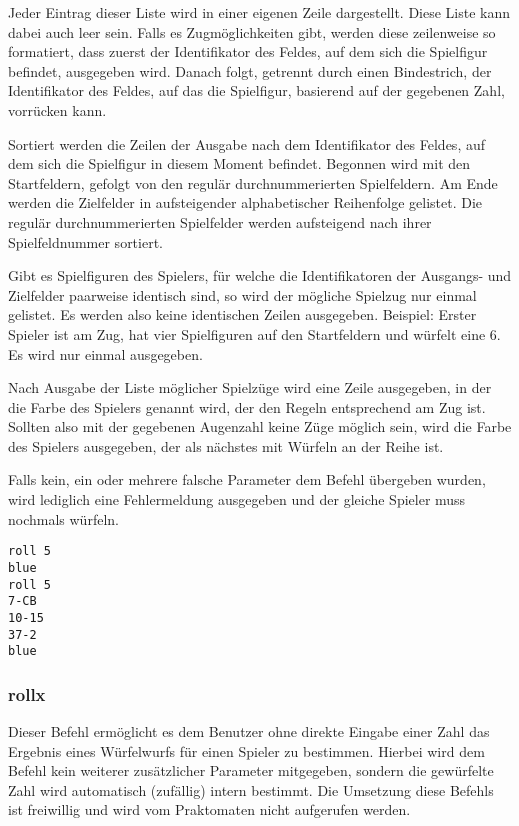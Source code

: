 Jeder Eintrag dieser Liste wird in einer eigenen Zeile dargestellt. Diese Liste kann dabei auch leer sein. Falls es Zugmöglichkeiten gibt, werden diese zeilenweise so formatiert, dass zuerst der Identifikator des Feldes, auf dem sich die Spielfigur befindet, ausgegeben wird. Danach folgt, getrennt durch einen Bindestrich, der Identifikator des Feldes, auf das die Spielfigur, basierend auf der gegebenen Zahl, vorrücken kann.

Sortiert werden die Zeilen der Ausgabe nach dem Identifikator des Feldes, auf dem sich die Spielfigur in diesem Moment befindet. Begonnen wird mit den Startfeldern, gefolgt von den regulär durchnummerierten Spielfeldern. Am Ende werden die Zielfelder in aufsteigender alphabetischer Reihenfolge gelistet. Die regulär durchnummerierten Spielfelder werden aufsteigend nach ihrer Spielfeldnummer sortiert.

Gibt es Spielfiguren des Spielers, für welche die Identifikatoren der Ausgangs- und Zielfelder paarweise identisch sind, so wird der mögliche Spielzug nur einmal gelistet. Es werden also keine identischen Zeilen ausgegeben. Beispiel: Erster Spieler ist am Zug, hat vier Spielfiguren auf den Startfeldern und würfelt eine 6. Es wird nur einmal  ausgegeben. 

Nach Ausgabe der Liste möglicher Spielzüge wird eine Zeile ausgegeben, in der die Farbe des Spielers genannt wird, der den Regeln entsprechend am Zug ist.
Sollten also mit der gegebenen Augenzahl keine Züge möglich sein, wird die Farbe des Spielers ausgegeben, der als nächstes mit Würfeln an der Reihe ist.

Falls kein, ein oder mehrere falsche Parameter dem Befehl übergeben wurden, wird lediglich eine Fehlermeldung ausgegeben und der gleiche Spieler muss nochmals würfeln.

\begin{tcolorbox}[title=Beispiel]
\begin{verbatim}
roll 5
blue
roll 5
7-CB
10-15
37-2
blue
\end{verbatim}
\end{tcolorbox}

\subsubsection*{rollx}
Dieser Befehl ermöglicht es dem Benutzer ohne direkte Eingabe einer Zahl das Ergebnis eines Würfelwurfs für einen Spieler zu bestimmen. Hierbei wird dem Befehl kein weiterer zusätzlicher Parameter mitgegeben, sondern die gewürfelte Zahl wird automatisch (zufällig) intern bestimmt. Die Umsetzung diese Befehls ist freiwillig und wird vom Praktomaten nicht aufgerufen werden.
